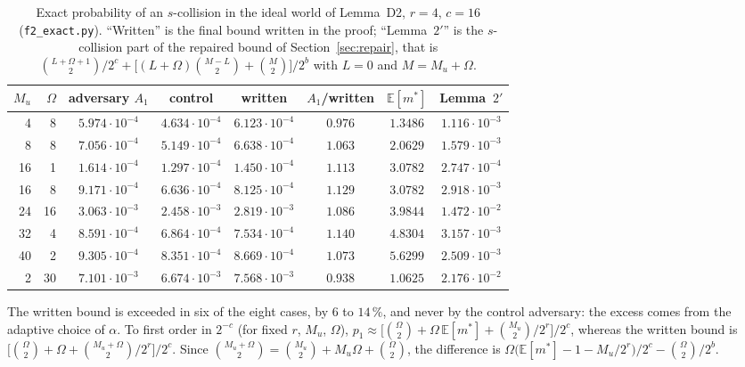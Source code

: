 \documentclass[11pt,a4paper]{article}
\theoremstyle{definition}
\theoremstyle{remark}
\newcommand{\E}{\mathbb{E}}
\newcommand{\file}[1]{\texttt{#1}}
\begin{document}
\begin{table}[ht]
\centering
\caption{Exact probability of an $s$-collision in the ideal world of Lemma~D2, $r = 4$, $c = 16$
(\file{f2\_exact.py}). ``Written'' is the final bound written in the proof; ``Lemma~$2'$'' is the
$s$-collision part of the repaired bound of Section~\ref{sec:repair}, that is
$\binom{L+\Omega+1}{2}/2^c + \bigl[(L+\Omega)\binom{M-L}{2} + \binom{M}{2}\bigr]/2^b$ with $L = 0$ and $M = M_u + \Omega$.}\label{tab:f2}
\smallskip
\begin{tabular}{rrcccccc}
\toprule
$M_u$ & $\Omega$ & adversary $A_1$ & control & written & $A_1$/written & $\E[m^*]$ & Lemma~$2'$ \\
\midrule
 4 &  8 & $5.974\cdot10^{-4}$ & $4.634\cdot10^{-4}$ & $6.123\cdot10^{-4}$ & $0.976$ & $1.3486$ & $1.116\cdot10^{-3}$ \\
 8 &  8 & $7.056\cdot10^{-4}$ & $5.149\cdot10^{-4}$ & $6.638\cdot10^{-4}$ & $\mathbf{1.063}$ & $2.0629$ & $1.579\cdot10^{-3}$ \\
16 &  1 & $1.614\cdot10^{-4}$ & $1.297\cdot10^{-4}$ & $1.450\cdot10^{-4}$ & $\mathbf{1.113}$ & $3.0782$ & $2.747\cdot10^{-4}$ \\
16 &  8 & $9.171\cdot10^{-4}$ & $6.636\cdot10^{-4}$ & $8.125\cdot10^{-4}$ & $\mathbf{1.129}$ & $3.0782$ & $2.918\cdot10^{-3}$ \\
24 & 16 & $3.063\cdot10^{-3}$ & $2.458\cdot10^{-3}$ & $2.819\cdot10^{-3}$ & $\mathbf{1.086}$ & $3.9844$ & $1.472\cdot10^{-2}$ \\
32 &  4 & $8.591\cdot10^{-4}$ & $6.864\cdot10^{-4}$ & $7.534\cdot10^{-4}$ & $\mathbf{1.140}$ & $4.8304$ & $3.157\cdot10^{-3}$ \\
40 &  2 & $9.305\cdot10^{-4}$ & $8.351\cdot10^{-4}$ & $8.669\cdot10^{-4}$ & $\mathbf{1.073}$ & $5.6299$ & $2.509\cdot10^{-3}$ \\
 2 & 30 & $7.101\cdot10^{-3}$ & $6.674\cdot10^{-3}$ & $7.568\cdot10^{-3}$ & $0.938$ & $1.0625$ & $2.176\cdot10^{-2}$ \\
\bottomrule
\end{tabular}
\end{table}

The written bound is exceeded in six of the eight cases, by $6$ to $14\,\%$, and never by the control adversary: the
excess comes from the adaptive choice of $\alpha$. To first order in $2^{-c}$ (for fixed $r$, $M_u$, $\Omega$),
$p_1 \approx \bigl[\binom{\Omega}{2} + \Omega\,\E[m^*] + \binom{M_u}{2}/2^r\bigr]/2^c$, whereas the written bound is
$\bigl[\binom{\Omega}{2} + \Omega + \binom{M_u + \Omega}{2}/2^r\bigr]/2^c$. Since
$\binom{M_u+\Omega}{2} = \binom{M_u}{2} + M_u\Omega + \binom{\Omega}{2}$, the difference is
$\Omega\bigl(\E[m^*] - 1 - M_u/2^r\bigr)/2^c - \binom{\Omega}{2}/2^b$.
\end{document}
